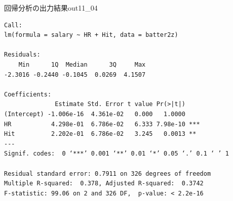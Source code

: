 \begin{Rscreen}{回帰分析の出力結果}{out11_04}
	\begin{verbatim}
Call:
lm(formula = salary ~ HR + Hit, data = batter2z)

Residuals:
    Min      1Q  Median      3Q     Max 
-2.3016 -0.2440 -0.1045  0.0269  4.1507 

Coefficients:
              Estimate Std. Error t value Pr(>|t|)    
(Intercept) -1.006e-16  4.361e-02   0.000   1.0000    
HR           4.298e-01  6.786e-02   6.333 7.98e-10 ***
Hit          2.202e-01  6.786e-02   3.245   0.0013 ** 
---
Signif. codes:  0 ‘***’ 0.001 ‘**’ 0.01 ‘*’ 0.05 ‘.’ 0.1 ‘ ’ 1

Residual standard error: 0.7911 on 326 degrees of freedom
Multiple R-squared:  0.378,	Adjusted R-squared:  0.3742 
F-statistic: 99.06 on 2 and 326 DF,  p-value: < 2.2e-16
\end{verbatim}
\end{Rscreen}
